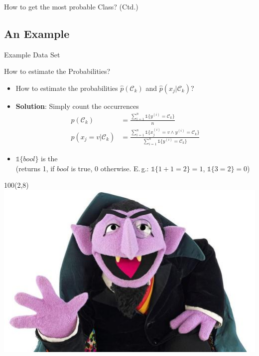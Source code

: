 \begin{frame}{How to get the most probable Class? (Ctd.)}{}
	\vspace*{-2mm}
	
\end{frame}


\subsection{An Example}

\begin{frame}{Example Data Set}{}
	
\end{frame}


\begin{frame}{How to estimate the Probabilities?}{}
	\begin{itemize}
		\item How to estimate the probabilities $\widehat{p}(\mathcal{C}_k)$ and $\widehat{p}(x_j \vert \mathcal{C}_k)$?
		\item \textbf{Solution}: Simply count the occurrences
		\begin{align}
			\widehat{p}(\mathcal{C}_k)
				&= \frac{\sum_{i=1}^n \mathbb{1}\{ y^{(i)} = \mathcal{C}_k \}}{n} \\[3mm]
			\widehat{p}(x_j = v \vert \mathcal{C}_k)
				&= \frac{\sum_{i=1}^n \mathbb{1}\{ x_j^{(i)} = v \wedge y^{(i)} = \mathcal{C}_k \}}
					{\sum_{i=1}^n \mathbb{1}\{ y^{(i)} = \mathcal{C}_k \}}
		\end{align}
		\item $\mathbb{1}\{ bool \}$ is the  \\[-1mm]
			{\scriptsize (returns 1, if $bool$ is true, 0 otherwise.
			E.\,g.: $\mathbb{1}\{1+1=2\} = 1$, $\mathbb{1}\{3=2\} = 0$)}
	\end{itemize}
	\begin{textblock}{100}(2,8)
		\includegraphics[scale=0.5]{03_decision_theory/02_img/count_count}
	\end{textblock}
\end{frame}


